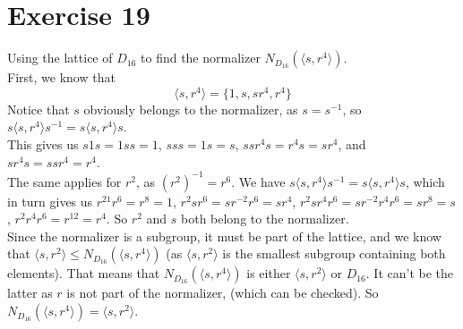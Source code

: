 \documentclass[12pt]{article}
\begin{document}
    \section*{Exercise 19}
    Using the lattice of $D_{16}$ to find the normalizer 
    $N_{D_{16}}(\langle s, r^4 \rangle)$. \\
    First, we know that 
    \[ \langle s, r^4 \rangle = \{ 1, s, sr^4, r^4 \} \]
    Notice that $s$ obviously belongs to the normalizer,
    as $s = s^{-1}$,
    so $s\langle s, r^4 \rangle s^{-1} = s\langle s, r^4 \rangle s$. \\
    This gives us $s1s = 1ss = 1$, 
    $sss = 1s = s$,  
    $ssr^4s = r^4s = sr^4$,
    and $sr^4s = ssr^4 = r^4$. \\
    The same applies for $r^2$, as $(r^2)^{-1} = r^6$.
    We have $s\langle s, r^4 \rangle s^{-1} = s\langle s, r^4 \rangle s$,
    which in turn gives us
    $r^21r^6 = r^8 = 1$,    
    $r^2sr^6 = sr^{-2}r^6 = sr^4$,
    $r^2sr^4r^6 = sr^{-2}r^4r^6 = sr^8 = s$,
    $r^2r^4r^6 = r^12 = r^4$.
    So $r^2$ and $s$ both belong to the normalizer. \\
    Since the normalizer is a subgroup,
    it must be part of the lattice,
    and we know that 
    $\langle s, r^2 \rangle \leqslant N_{D_{16}}(\langle s, r^4 \rangle)$
    (as $\langle s, r^2 \rangle$ is the smallest subgroup
    containing both elements).
    That means that $N_{D_{16}}(\langle s, r^4 \rangle)$ is either
    $\langle s, r^2 \rangle$ or $D_{16}$.
    It can't be the latter as $r$ is not part of the normalizer,
    (which can be checked).
    So $N_{D_{16}}(\langle s, r^4 \rangle) = \langle s, r^2 \rangle$.
\end{document}
